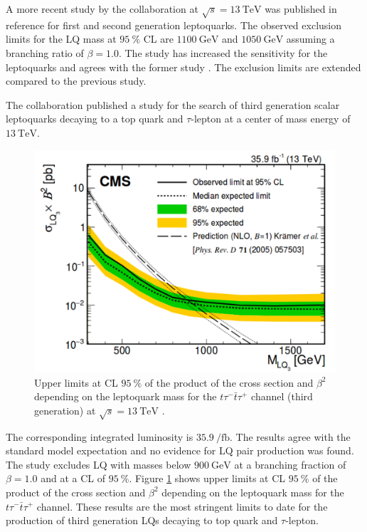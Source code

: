 A more recent study by the {\ATLAS} collaboration at $\sqrt{s}=\SI{13}{\tera\electronvolt}$ was published in reference \cite{currentStatus:13TeVATLAS} for first and second generation leptoquarks. The observed exclusion limits for the LQ mass at $\SI{95}{\percent}$ CL are $\SI{1100}{\giga\electronvolt}$ and $\SI{1050}{\giga\electronvolt}$ assuming a branching ratio of $\beta=1.0$. The study has increased the sensitivity for the leptoquarks and agrees with the former study \cite{currentStatus:8TeVATLAS}. The exclusion limits are extended \cite{currentStatus:13TeVATLAS} compared to the previous study.\par
The {\CMS} collaboration published a study for the search of third generation scalar leptoquarks decaying to a top quark and $\tau$-lepton at a center of mass energy of $\SI{13}{\tera\electronvolt}$.
%
\begin{figure}[htbp]                                 
 \begin{center}                                       
  \includegraphics[width=0.6\linewidth]{figures/exclusionLQ.pdf} 
   \caption[Upper limits of the product of the cross section and $\beta^2$ depending on the leptoquark mass for the $t\tau^-\bar{t}\tau^+$ channel.]{Upper limits at CL $\SI{95}{\percent}$ of the product of the cross section and $\beta^2$ depending on the leptoquark mass for the $t\tau^-\bar{t}\tau^+$ channel (third generation) at $\sqrt{s}=\SI{13}{\tera\electronvolt}$ \cite{currentStatus:13TeVATLAS}.}
  \label{exclusionLQ}                                     
 \end{center}
\end{figure}
%
The corresponding integrated luminosity is $\SI{35.9}{\per\femto\barn}$. The results agree with the standard model expectation and no evidence for LQ pair production was found. The study excludes LQ with masses below $\SI{900}{\giga\electronvolt}$ at a branching fraction of $\beta=1.0$ and at a CL of $\SI{95}{\percent}$. Figure \ref{exclusionLQ} shows upper limits at CL $\SI{95}{\percent}$ of the product of the cross section and $\beta^2$ depending on the leptoquark mass for the $t\tau^-\bar{t}\tau^+$ channel. These results are the most stringent limits to date for the production of third generation LQs decaying to top quark and $\tau$-lepton. \cite{currentStatus:13TeVCMS}\par
